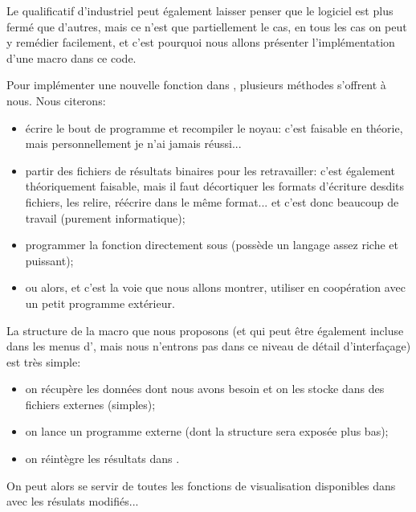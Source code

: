 Le qualificatif d'industriel peut également laisser penser que le logiciel est plus fermé que d'autres, mais ce
n'est que partiellement le cas, en tous les cas on peut y remédier facilement, et c'est pourquoi nous allons
présenter l'implémentation d'une macro dans ce code.

\medskip
Pour implémenter une nouvelle fonction dans \ansys, plusieurs méthodes s'offrent à nous. Nous citerons:
\begin{itemize}
   \item écrire le bout de programme et recompiler le noyau: c'est faisable en théorie, mais personnellement je n'ai
	jamais réussi...
   \item partir des fichiers de résultats binaires pour les retravailler: c'est également théoriquement faisable, mais
	il faut décortiquer les formats d'écriture desdits fichiers, les relire, réécrire dans le même format...
	et c'est donc beaucoup de travail (purement informatique);
   \item programmer la fonction directement sous \ansys (\ansys possède un langage assez riche et puissant);
   \item ou alors, et c'est la voie que nous allons montrer, utiliser \ansys en \og coopération\fg{} avec un
	petit programme extérieur.
\end{itemize}

\medskip
La structure de la macro \ansys que nous proposons (et qui peut être également incluse dans les menus d'\ansys, mais
nous n'entrons pas dans ce niveau de détail d'interfaçage) est très simple:
\begin{itemize}
   \item on récupère les données dont nous avons besoin et on les stocke dans des fichiers externes (simples);
   \item on lance un programme externe (dont la structure sera exposée plus bas);
   \item on réintègre les résultats dans \ansys.
\end{itemize}
On peut alors se servir de toutes les fonctions de visualisation disponibles dans \ansys avec les résulats modifiés...

